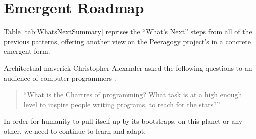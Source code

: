 \section{Emergent Roadmap} \label{sec:Distributed_Roadmap}

Table \ref{tab:WhatsNextSummary} reprises the ``What's Next'' steps from all of the previous
patterns, offering another view on the Peeragogy project's
 in a concrete emergent form.

Architectual maverick Christopher Alexander asked the following questions to an audience of computer programmers \cite{alexander1999origins}: 
\begin{quote}
``What is the Chartres of programming? What task is at a high enough level to inspire people writing programs, to reach for the stars?''
\end{quote}
In order for humanity to pull itself up by its bootstraps, on this planet or any other, we need to continue to learn and adapt.


